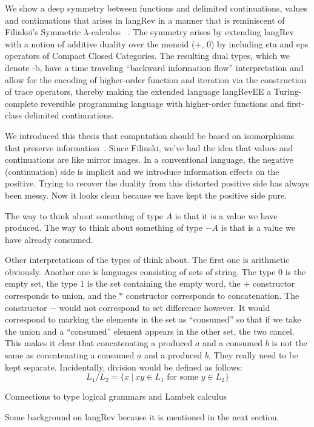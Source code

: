 \documentclass[preprint]{sigplanconf}
\newcommand{\lcal}{\ensuremath{\lambda}-calculus}
\begin{document}
We show a deep symmetry between functions and delimited continuations,
values and continuations that arises in {{langRev}} in a manner that
is reminiscent of Filinksi's Symmetric \lcal
~\cite{Filinski:1989:DCI:648332.755574}. The symmetry arises by
extending {{langRev}} with a notion of additive duality over the
monoid {{(+, 0)}} by including {{eta}} and {{eps}} operators of
Compact Closed Categories. The resulting dual types, which we denote
{{-b}}, have a time traveling ``backward information flow''
interpretation and allow for the encoding of higher-order function and
iteration via the construction of {{trace}} operators, thereby making
the extended language {{langRevEE}} a Turing-complete reversible
programming language with higher-order functions and first-class
delimited continuations.

We introduced this thesis that computation should be based on isomorphisms
that preserve information~\cite{infeffects}. Since Filinski, we've had the
idea that values and continuations are like mirror images. In a conventional
language, the negative (continuation) side is implicit and we introduce
information effects on the positive. Trying to recover the duality from this
distorted positive side has always been messy. Now it looks clean because we
have kept the positive side pure.

The way to think about something of type $A$ is that it is a value we have
produced. The way to think about something of type $-A$ is that is a value we
have already consumed. 

Other interpretations of the types of think about. The first one is
arithmetic obviously. Another one is languages consisting of sets of
string. The type 0 is the empty set, the type 1 is the set containing the
empty word, the $+$ constructor corresponds to union, and the $*$ constructor
corresponds to concatenation. The constructor $-$ would not correspond to set
difference however. It would correspond to marking the elements in the set as
``consumed'' so that if we take the union and a ``consumed'' element appears
in the other set, the two cancel. This makes it clear that concatenating a
produced $a$ and a consumed $b$ is not the same as concatenating a consumed
$a$ and a produced $b$. They really need to be kept separate. Incidentally,
division would be defined as follows:
\[
L_1 / L_2 = \{ x ~|~ xy \in L_1 \mbox{~for~some~} y \in L_2 \}
\]

Connections to type logical grammars and Lambek calculus

Some background on {{langRev}} because it is mentioned in the next section.
\end{document}
